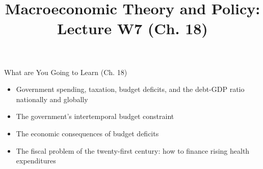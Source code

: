 \documentclass[aspectratio=1610]{beamer}
\title[Winter - Lecture 7] %
{Macroeconomic Theory and Policy: Lecture  W7 (Ch. 18)}
\author[University of Toronto] %
{}
\date[] %
\begin{document}
\begin{frame}
  \titlepage
\end{frame}


\begin{frame}[wide]{What are You Going to Learn (Ch. 18)}
	\begin{itemize}
		\item Government spending, taxation, budget deficits, and the debt-GDP ratio nationally and globally
		\vspace{3mm}
		\item The government’s intertemporal budget constraint
		\vspace{3mm}
		\item The economic consequences of budget deficits
		\vspace{3mm}
		\item The fiscal problem of the twenty-first century: how to finance rising health expenditures
	\end{itemize}
\end{frame}

%		
\end{document}
